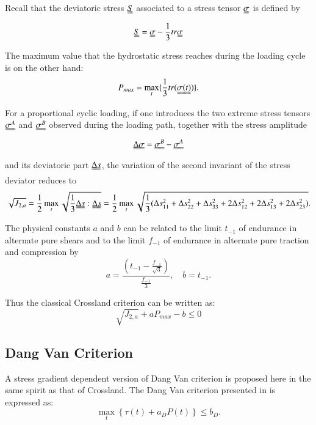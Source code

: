 \documentclass[3p,times,procedia,number]{elsarticle}
\begin{document}
Recall that the deviatoric stress $\uuline{S}$ associated to a stress tensor $\uuline{\sigma}$  is defined by
\begin{equation} \uuline{S}=\uuline{\sigma}-\frac{1}{3}tr\uuline{\sigma} 
\end{equation}

The maximum value that the hydrostatic stress reaches during the loading cycle is on the other hand:
\begin{equation}
	P_{max}=\max\limits_{t}\{\frac{1}{3}tr(\uuline{\sigma(t)})\}.
\end{equation}

For a proportional cyclic loading, if one introduces the two extreme stress tensors $\uuline{\sigma^A}$ and $\uuline{\sigma^B}$ observed during the loading path, together with the stress amplitude
\begin{equation}\uuline{\Delta\sigma}=\uuline{\sigma^B}-\uuline{\sigma^A}\end{equation}
and its deviatoric part $\uuline{\Delta s} $, the variation of
the second invariant of the stress deviator reduces to 
\begin{equation}\sqrt{J_{2,a}}=\frac{1}{2}\max\limits_{t}\sqrt{\frac{1}{3}\uuline{\Delta s}:\uuline{\Delta s}}=\frac{1}{2}\max\limits_{t}\sqrt{\frac{1}{3}(\Delta s_{11}^2+\Delta s_{22}^2+\Delta s_{33}^2+2\Delta s_{12}^2+2\Delta s_{13}^2+2\Delta s_{23}^2)}.\end{equation}

The physical constants $a$ and $b$ can be related to  the limit $t_{-1}$ of endurance in alternate pure shears and to the limit $f_{-1}$ of endurance in alternate pure traction and compression by
\begin{equation}
	a=\frac{(t_{-1}-\frac{f_{-1}}{\sqrt{3}})}{\frac{f_{-1}}{3}}, \quad 
	b=t_{-1}.
\end{equation}

Thus the classical Crossland criterion can be written as:
\begin{equation}
	\sqrt{J_{2,a}}+a{P_{max}}-b\leqslant 0
\end{equation}

\subsection{Dang Van Criterion}
A stress gradient dependent version of Dang Van criterion is proposed here in the same spirit as that of Crossland.
The Dang Van criterion presented in \cite{ballard1995high} is expressed as:
\begin{equation}
	\max \limits_{t}\left\{\tau{(t)}+a_DP{(t)}\right\}\leqslant b_D.
	\label{dv}
\end{equation}
\end{document}
